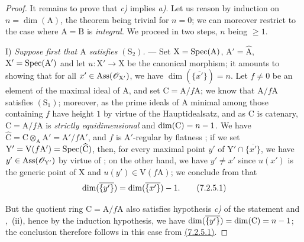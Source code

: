 \begin{proof}

It remains to prove that \emph{c)} implies \emph{a)}.
Let us reason by induction on $n=\dim(\mathrm{A})$, the theorem being trivial for $n=0$; we can moreover restrict to the case where $\mathrm{A}=\mathrm{B}$ is \emph{integral}.
We proceed in two steps, $n$ being $\geqslant 1$.

\medskip\noindent
I) \emph{Suppose first that $\mathrm{A}$ satisfies $(\mathrm{S}_2)$.} ---
Set $\mathrm{X}=\operatorname{Spec}(\mathrm{A})$, $\mathrm{A}'=\widehat{\mathrm{A}}$, $\mathrm{X}'=\operatorname{Spec}(\mathrm{A}')$ and let $u:\mathrm{X}'\to\mathrm{X}$ be the canonical morphism; it amounts to showing that for all $x'\in\operatorname{Ass}(\mathscr{O}_{\mathrm{X}'})$, we have $\dim(\overline{\{x'\}})=n$.
Let $f\neq 0$ be an element of the maximal ideal of $\mathrm{A}$, and set $\mathrm{C}=\mathrm{A}/f\mathrm{A}$; we know  that $\mathrm{A}/f\mathrm{A}$ satisfies $(\mathrm{S}_1)$; moreover, as the prime ideals of $\mathrm{A}$ minimal among those containing $f$ have height $1$ by virtue of the Hauptidealsatz, and as $\mathrm{C}$ is catenary, $\mathrm{C}=\mathrm{A}/f\mathrm{A}$ is \emph{strictly equidimensional} and $\dim(\mathrm{C})=n- 1$.
We have $\widehat{\mathrm{C}}=\mathrm{C}\otimes_\mathrm{A}\mathrm{A}'=\mathrm{A}'/f\mathrm{A}'$, and $f$ is $\mathrm{A}'$-regular by flatness ; if we set $\mathrm{Y}'=\mathrm{V}(f\mathrm{A}')=\operatorname{Spec}(\widehat{\mathrm{C}})$, then, for every maximal point $y'$ of $\mathrm{Y}'\cap\overline{\{x'\}}$, we have $y'\in\operatorname{Ass}(\mathscr{O}_{\mathrm{Y}'})$ by virtue of ; on the other hand, we have $y'\neq x'$ since $u(x')$ is the generic point of $\mathrm{X}$  and $u(y')\in\mathrm{V}(f\mathrm{A})$; we conclude from  that
\[
  \dim(\overline{\{y'\}})=\dim(\overline{\{x'\}})- 1.
  \tag{7.2.5.1}
\label{IV.7.2.5.1}
\]

But the quotient ring $\mathrm{C}=\mathrm{A}/f\mathrm{A}$ also satisfies hypothesis \emph{c)} of the statement  and ,~(ii), hence by the induction hypothesis, we have $\dim(\overline{\{y'\}})=\dim(\mathrm{C})=n- 1$; the conclusion therefore follows in this case from {\hyperref[IV.7.2.5.1]{(7.2.5.1)}}.


\end{proof}
